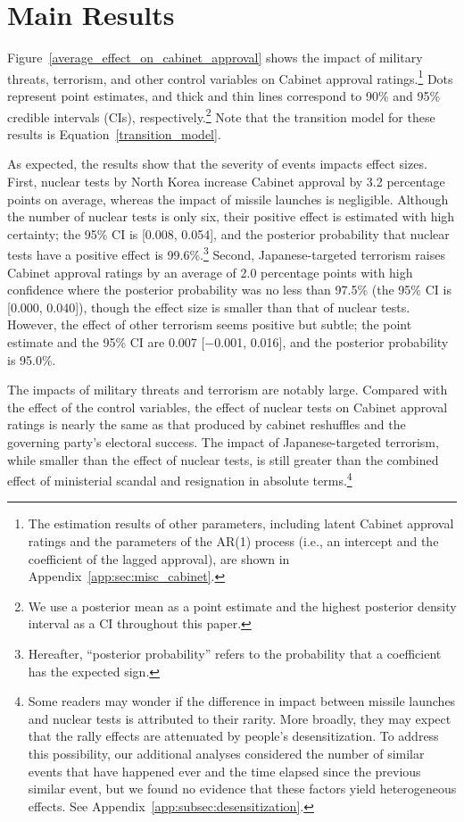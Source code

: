 \documentclass[letterpaper,12pt]{scrartcl}
\begin{document}
\section*{Main Results\centering}

Figure~\ref{average_effect_on_cabinet_approval} shows the impact of military threats, terrorism, and other control variables on Cabinet approval ratings.\footnote{The estimation results of other parameters, including latent Cabinet approval ratings and the parameters of the AR(1) process (i.e., an intercept and the coefficient of the lagged approval), are shown in Appendix~\ref{app:sec:misc_cabinet}.} Dots represent point estimates, and thick and thin lines correspond to 90\% and 95\% credible intervals (CIs), respectively.\footnote{We use a posterior mean as a point estimate and the highest posterior density interval as a CI throughout this paper.} Note that the transition model for these results is Equation~\ref{transition_model}.

As expected, the results show that the severity of events impacts effect sizes. First, nuclear tests by North Korea increase Cabinet approval by 3.2 percentage points on average, whereas the impact of missile launches is negligible. Although the number of nuclear tests is only six, their positive effect is estimated with high certainty; the 95\% CI is [0.008, 0.054], and the posterior probability that nuclear tests have a positive effect is 99.6\%.\footnote{Hereafter, ``posterior probability'' refers to the probability that a coefficient has the expected sign.} Second, Japanese-targeted terrorism raises Cabinet approval ratings by an average of 2.0 percentage points with high confidence where the posterior probability was no less than 97.5\% (the 95\% CI is [0.000, 0.040]), though the effect size is smaller than that of nuclear tests. However, the effect of other terrorism seems positive but subtle; the point estimate and the 95\% CI are 0.007 [$-$0.001, 0.016], and the posterior probability is 95.0\%.

The impacts of military threats and terrorism are notably large. Compared with the effect of the control variables, the effect of nuclear tests on Cabinet approval ratings is nearly the same as that produced by cabinet reshuffles and the governing party's electoral success. The impact of Japanese-targeted terrorism, while smaller than the effect of nuclear tests, is still greater than the combined effect of ministerial scandal and resignation in absolute terms.\footnote{Some readers may wonder if the difference in impact between missile launches and nuclear tests is attributed to their rarity. More broadly, they may expect that the rally effects are attenuated by people's desensitization. To address this possibility, our additional analyses considered the number of similar events that have happened ever and the time elapsed since the previous similar event, but we found no evidence that these factors yield heterogeneous effects. See Appendix~\ref{app:subsec:desensitization}.}
\end{document}
